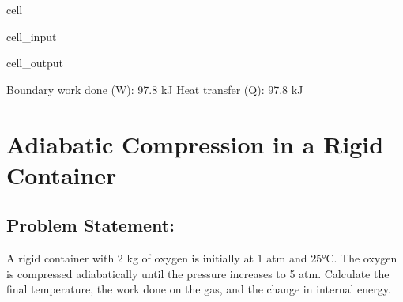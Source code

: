 \documentclass[letterpaper,10pt,english]{jupyterBook}
\begin{document}
\begin{sphinxuseclass}{cell}
\begin{sphinxVerbatimInput}
\begin{sphinxuseclass}{cell_input}
\begin{sphinxVerbatim}[commandchars=\\\{\}]
\end{sphinxVerbatim}

\end{sphinxuseclass}\end{sphinxVerbatimInput}
\begin{sphinxVerbatimOutput}

\begin{sphinxuseclass}{cell_output}
\begin{sphinxVerbatim}[commandchars=\\\{\}]
Boundary work done (W): 97.8 kJ
Heat transfer (Q): 97.8 kJ
\end{sphinxVerbatim}

\end{sphinxuseclass}\end{sphinxVerbatimOutput}

\end{sphinxuseclass}
\sphinxstepscope


\section{Adiabatic Compression in a Rigid Container}
\label{\detokenize{notebooks/Chapter4/Adiabatic_Compression_Rigid_Container_Problem_8:adiabatic-compression-in-a-rigid-container}}\label{\detokenize{notebooks/Chapter4/Adiabatic_Compression_Rigid_Container_Problem_8::doc}}

\subsection{Problem Statement:}
\label{\detokenize{notebooks/Chapter4/Adiabatic_Compression_Rigid_Container_Problem_8:problem-statement}}
\sphinxAtStartPar
A rigid container with 2 kg of oxygen is initially at 1 atm and 25°C.
The oxygen is compressed adiabatically until the pressure increases to 5 atm.
Calculate the final temperature, the work done on the gas, and the change in internal energy.
\end{document}
